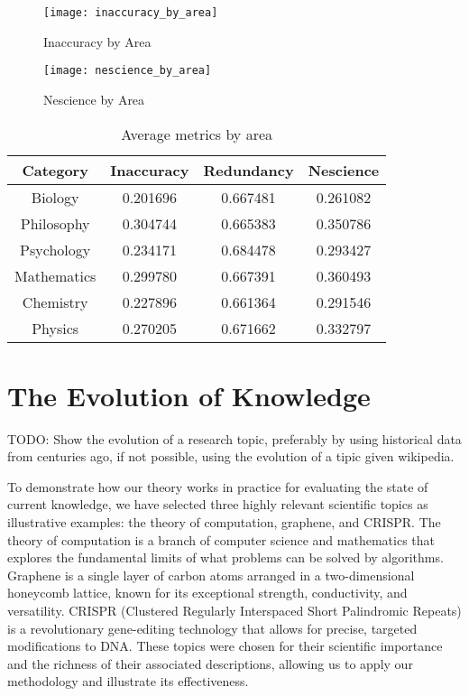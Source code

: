 \begin{figure}[h]
\centering\texttt{[image: inaccuracy\_by\_area]}
\caption{\label{fig:Surfeit-of-Topics}Inaccuracy by Area}
\end{figure}

\begin{figure}[h]
\centering\texttt{[image: nescience\_by\_area]}
\caption{\label{fig:Surfeit-of-Topics}Nescience by Area}
\end{figure}


\begin{table}
\begin{centering}
\begin{tabular}{|c|c|c|c|}
\hline 
Category & Inaccuracy & Redundancy & Nescience \tabularnewline
\hline 
\hline
Biology & 0.201696 & 0.667481 & 0.261082 \tabularnewline
\hline
Philosophy & 0.304744 & 0.665383 & 0.350786 \tabularnewline
\hline
Psychology & 0.234171 & 0.684478 & 0.293427 \tabularnewline
\hline
Mathematics & 0.299780 & 0.667391 & 0.360493 \tabularnewline
\hline
Chemistry & 0.227896 & 0.661364 & 0.291546 \tabularnewline
\hline
Physics & 0.270205 & 0.671662 & 0.332797 \tabularnewline
\hline
\end{tabular}
\par\end{centering}
\caption{\label{tab:average_metrics_by_area}Average metrics by area}
\end{table}
           
%
%
\section{The Evolution of Knowledge}

{\color{red} TODO: Show the evolution of a research topic, preferably by using historical data from centuries ago, if not possible, using the evolution of a tipic given wikipedia.}

To demonstrate how our theory works in practice for evaluating the state of current knowledge, we have selected three highly relevant scientific topics as illustrative examples: the theory of computation, graphene, and CRISPR. The theory of computation is a branch of computer science and mathematics that explores the fundamental limits of what problems can be solved by algorithms. Graphene is a single layer of carbon atoms arranged in a two-dimensional honeycomb lattice, known for its exceptional strength, conductivity, and versatility. CRISPR (Clustered Regularly Interspaced Short Palindromic Repeats) is a revolutionary gene-editing technology that allows for precise, targeted modifications to DNA. These topics were chosen for their scientific importance and the richness of their associated descriptions, allowing us to apply our methodology and illustrate its effectiveness.


